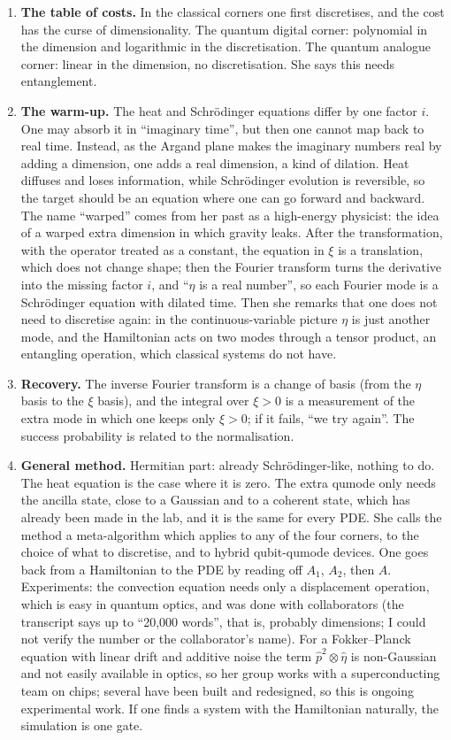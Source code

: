 \begin{enumerate}
\item {\bf The table of costs.} In the
classical corners one first discretises, and
the cost has the curse of dimensionality. The
quantum digital corner: polynomial in the
dimension and logarithmic in the
discretisation. The quantum analogue corner:
linear in the dimension, no discretisation.
She says this needs entanglement.

\item {\bf The warm-up.} The heat and
Schr\"odinger equations differ by one factor
$i$. One may absorb it in ``imaginary time'',
but then one cannot map back to real time.
Instead, as the Argand plane makes the
imaginary numbers real by adding a dimension,
one adds a real dimension, a kind of
dilation. Heat diffuses and loses
information, while Schr\"odinger evolution is
reversible, so the target should be an
equation where one can go forward and
backward. The name ``warped'' comes from her
past as a high-energy physicist: the idea of
a warped extra dimension in which gravity
leaks. After the transformation, with the
operator treated as a constant, the equation
in $\xi$ is a translation, which does not
change shape; then the Fourier transform turns
the derivative into the missing factor $i$,
and ``$\eta$ is a real number'', so each
Fourier mode is a Schr\"odinger equation with
dilated time. Then she remarks that one does
not need to discretise again: in the
continuous-variable picture $\eta$ is just
another mode, and the Hamiltonian acts on two
modes through a tensor product, an entangling
operation, which classical systems do not
have.

\item {\bf Recovery.} The inverse Fourier
transform is a change of basis (from the
$\eta$ basis to the $\xi$ basis), and the
integral over $\xi>0$ is a measurement of the
extra mode in which one keeps only $\xi>0$; if
it fails, ``we try again''. The success
probability is related to the normalisation.

\item {\bf General method.} Hermitian part:
already Schr\"odinger-like, nothing to do.
The heat equation is the case where it is
zero. The extra qumode only needs the
ancilla state, close to a Gaussian and to a
coherent state, which has already been made in
the lab, and it is the same for every PDE.
She calls the method a meta-algorithm which
applies to any of the four corners, to the
choice of what to discretise, and to hybrid
qubit-qumode devices. One goes back from a
Hamiltonian to the PDE by reading off $A_1$,
$A_2$, then $A$. Experiments: the convection
equation needs only a displacement operation,
which is easy in quantum optics, and was done
with collaborators (the transcript says up to
``20,000 words'', that is, probably
dimensions; I could not verify the number or
the collaborator's name). For a Fokker--Planck
equation with linear drift and additive
noise the term $\hat p^2\otimes\hat\eta$ is
non-Gaussian and not easily available in
optics, so her group works with a
superconducting team on chips; several have
been built and redesigned, so this is ongoing
experimental work. If one finds a system with
the Hamiltonian naturally, the simulation is
one gate.


\end{enumerate}
